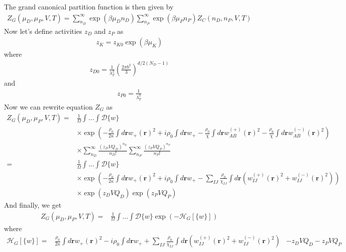 \documentclass{article}
\begin{document}
The grand canonical partition function is then given by
\begin{align*}
  Z_G(\mu_{D}, \mu_P, V, T) =
    \sum_{n_D}^\infty \exp(\beta\mu_D n_D)
    \sum_{n_P}^\infty \exp(\beta\mu_P n_P)
    Z_C(n_D, n_P, V, T)
\end{align*}
Now let's define activities $z_D$ and $z_P$ as
\begin{align*}
  z_K =
    z_{K0}
    \exp \left(\beta \mu_K \right)
\end{align*}
where
\begin{align*}
  z_{D0} =
    \frac{1}{\lambda_T^{3}}
    \left( \frac{2\pi b^2}{3} \right)^{d/2(N_D-1)}
\end{align*}
and
\begin{align*}
  z_{P0} =
    \frac{1}{\lambda_T^{3}}
\end{align*}
Now we can rewrite equation $Z_G$ as
\begin{align*}
  Z_G(\mu_D, \mu_P, V, T) =&
    \frac{1}{\Omega}
    \int \hdots \int \mathcal{D} \{w\} \\
    &\times \exp \left(
      - \frac{\rho_0}{2\kappa} \int d \mathbf{r} w_+(\mathbf{r})^2
      + i \rho_0 \int d\mathbf{r} w_+
      - \frac{\rho_0}{\chi} \int d \mathbf{r} w_{AB}^{(+)} (\mathbf{r})^2
      - \frac{\rho_0}{\chi} \int d \mathbf{r} w_{AB}^{(-)} (\mathbf{r})^2
    \right) \\
    &\times \sum_{n_D}^\infty \frac{(z_DVQ_D)^{n_D}}{n_D!}
    \sum_{n_P}^\infty \frac{(z_PVQ_P)^{n_P}}{n_P!} \\
    =& \frac{1}{\Omega}
    \int \hdots \int \mathcal{D} \{w\} \\
    &\times \exp \left(
      - \frac{\rho_0}{2\kappa} \int d \mathbf{r} w_+(\mathbf{r})^2
      + i \rho_0 \int d\mathbf{r} w_+
      - \sum_{IJ}
      \frac{\rho_0}{\chi_{IJ}}
      \int d \mathbf{r}
      \left(
        w_{IJ}^{(+)} (\mathbf{r})^2 + w_{IJ}^{(-)} (\mathbf{r})^2
      \right)
    \right) \\
    &\times \exp (z_DVQ_D) \exp (z_PVQ_P)
\end{align*}
And finally, we get
\begin{align*}
  Z_G(\mu_D, \mu_P, V, T) =&
    \frac{1}{\Omega}
    \int \hdots \int \mathcal{D} \{w\}
    \exp \left( - \mathcal{H}_G \left[\{w\} \right] \right)
\end{align*}
where
\begin{align*}
  \mathcal{H}_G[\{w\}] =&
    \frac{\rho_0}{2\kappa} \int d \mathbf{r} w_+(\mathbf{r})^2
    - i \rho_0 \int d\mathbf{r} w_+
    + \sum_{IJ}
    \frac{\rho_0}{\chi_{IJ}}
    \int d \mathbf{r}
    \left(
      w_{IJ}^{(+)} (\mathbf{r})^2 + w_{IJ}^{(-)} (\mathbf{r})^2
    \right)
    &- z_D V Q_D - z_P V Q_P
\end{align*}
\end{document}
